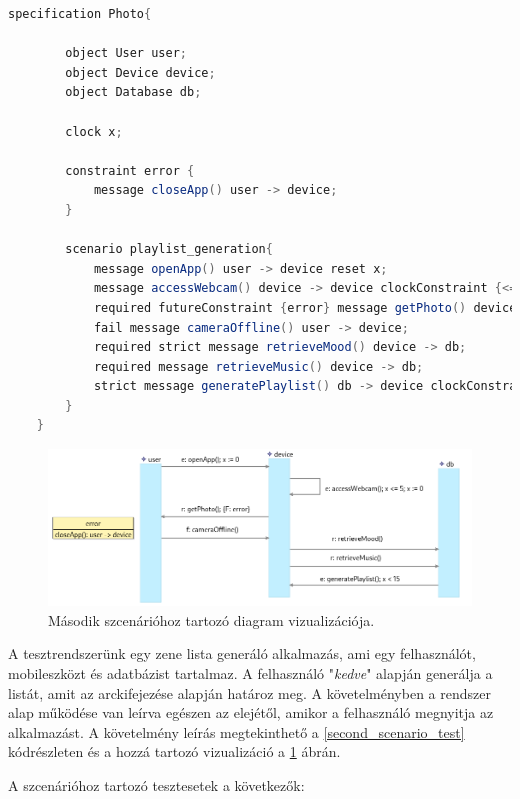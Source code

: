 \begin{lstlisting}[language=java, frame=single, float=ht!, caption={Második tesztesethez tartozó szcenárió.},captionpos=b,label=second_scenario_test]
    specification Photo{

        object User user;
        object Device device;
        object Database db;

        clock x;

        constraint error {
            message closeApp() user -> device;
        }

        scenario playlist_generation{
            message openApp() user -> device reset x;
            message accessWebcam() device -> device clockConstraint {<=(x, 5)} reset x;
            required futureConstraint {error} message getPhoto() device -> user;
            fail message cameraOffline() user -> device;
            required strict message retrieveMood() device -> db;
            required message retrieveMusic() device -> db;
            strict message generatePlaylist() db -> device clockConstraint {<(x, 15)};
        }
    }
\end{lstlisting}

\begin{figure}[!ht]
    \centering
    \includegraphics[width=160mm, keepaspectratio]{figures/diagramMobileExample.png}
    \caption{Második szcenárióhoz tartozó diagram vizualizációja.}
    \label{second_visualization}
\end{figure}

A tesztrendszerünk egy zene lista generáló alkalmazás, ami egy felhasználót, mobileszközt és adatbázist tartalmaz.
A felhasználó "\textit{kedve}" alapján generálja a listát, amit az arckifejezése alapján határoz meg.
A követelményben a rendszer alap működése van leírva egészen az elejétől, amikor a felhasználó megnyitja az alkalmazást.
A követelmény leírás megtekinthető a \ref{second_scenario_test} kódrészleten és a hozzá tartozó vizualizáció a \ref{second_visualization} ábrán.

A szcenárióhoz tartozó tesztesetek a következők:

